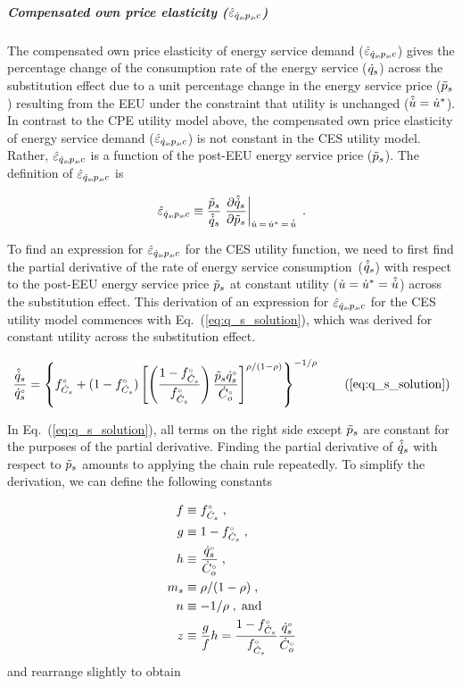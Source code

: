\documentclass[12pt]{article}\usepackage[]{graphicx}\usepackage[]{xcolor}
\begin{document}
\subparagraph{Compensated own price elasticity ($\hat{\varepsilon}_{\dot{q}_s\!,p_s\!,c}$)} 

The compensated own price elasticity of energy service demand ($\hat{\varepsilon}_{\dot{q}_s\!,p_s\!,c}$)
gives the percentage change of the consumption rate of the energy service ($\dot{q}_s$)
across the substitution effect
due to a unit percentage change in the energy service price ($\tilde{p}_s$)
resulting from the EEU
under the constraint that utility is unchanged 
($\hat{\dot{u}} = {\dot{u}}^*$).
In contrast to the CPE utility model above, 
the compensated own price elasticity of energy service demand ($\hat{\varepsilon}_{\dot{q}_s\!,p_s\!,c}$)
is not constant in the CES utility model.
Rather, $\hat{\varepsilon}_{\dot{q}_s\!,p_s\!,c}$ is a function of the post-EEU energy service price ($\tilde{p}_s$).
The definition of $\hat{\varepsilon}_{\dot{q}_s\!,p_s\!,c}$ is 

\begin{equation} \label{eq:eqspsC_def}
  \eqspsChat \equiv \frac{\amacro{p}_s}{\rasub{q}_s} \eval{\pdv{\rasub{q}_s}{\amacro{p}_s}}_{\rate{u} \, = \, \rbsub{u} \, = \, \rasub{u}} \; .
\end{equation}

To find an expression for $\hat{\varepsilon}_{\dot{q}_s\!,p_s\!,c}$ for the CES utility function, 
we need to first find the partial derivative of the rate of energy service consumption~($\hat{\dot{q}}_s$)
with respect to the post-EEU energy service price $\tilde{p}_s$ 
at constant utility ($\dot{u} = {\dot{u}}^* = \hat{\dot{u}}$)
across the substitution effect.
This derivation of an expression for $\hat{\varepsilon}_{\dot{q}_s\!,p_s\!,c}$ for the CES utility model
commences with Eq.~(\ref{eq:q_s_solution}),
which was derived for constant utility across the 
substitution effect. 

\begin{equation}
  \frac{\rasub{q}_s}{\rbempl{q}_s} = \qssolution{} \tag{\ref{eq:q_s_solution}}
\end{equation}

In Eq.~(\ref{eq:q_s_solution}), all terms on the right side except $\tilde{p}_s$ are constant 
for the purposes of the partial derivative. 
Finding the partial derivative 
of $\hat{\dot{q}}_s$ with respect to $\tilde{p}_s$
amounts to applying the chain rule repeatedly.
To simplify the derivation, 
we can define the following constants

\begin{align}
  f &\equiv {}{f}^{\scriptscriptstyle \circ}_{\dot{C}_s}{} \; , \\
  g &\equiv 1 - {}{f}^{\scriptscriptstyle \circ}_{\dot{C}_s}{} \; , \\
  h &\equiv \frac{{}{\dot{q}}^{\scriptscriptstyle \circ}_s}{{}{\dot{C}}^{\scriptscriptstyle \circ}_o} \; , \\
  m_s &\equiv \rho / (1 - \rho) \; , \\
  n &\equiv - 1 / \rho \; , \; \mathrm{and} \\
  z &\equiv \frac{g}{f} h = \frac{1 - {}{f}^{\scriptscriptstyle \circ}_{\dot{C}_s}}{{}{f}^{\scriptscriptstyle \circ}_{\dot{C}_s}} \frac{{}{\dot{q}}^{\scriptscriptstyle \circ}_s}{{}{\dot{C}}^{\scriptscriptstyle \circ}_o}
\end{align}
%
and rearrange slightly to obtain
\end{document}
